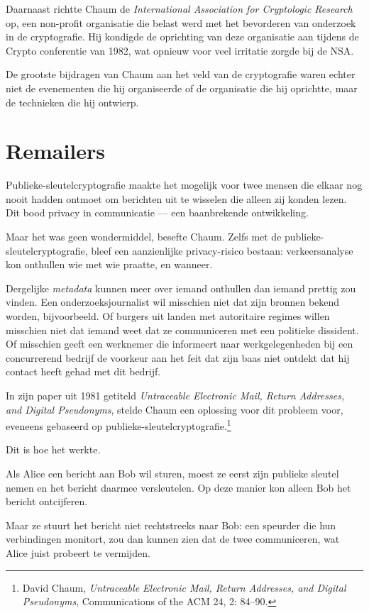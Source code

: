 \documentclass[
  a5paper,
  smalldemyvopaper,11pt,twoside,onecolumn,openright,extrafontsizes,
hidelinks]{memoir}
\begin{document}
Daarnaast richtte Chaum de \emph{International Association for
Cryptologic Research} op, een non-profit organisatie die belast werd met
het bevorderen van onderzoek in de cryptografie. Hij kondigde de
oprichting van deze organisatie aan tijdens de Crypto conferentie van
1982, wat opnieuw voor veel irritatie zorgde bij de NSA.

De grootste bijdragen van Chaum aan het veld van de cryptografie waren
echter niet de evenementen die hij organiseerde of de organisatie die
hij oprichtte, maar de technieken die hij ontwierp.

\section{Remailers}\label{remailers}

Publieke-sleutelcryptografie maakte het mogelijk voor twee mensen die
elkaar nog nooit hadden ontmoet om berichten uit te wisselen die alleen
zij konden lezen. Dit bood privacy in communicatie --- een baanbrekende
ontwikkeling.

Maar het was geen wondermiddel, besefte Chaum. Zelfs met de
publieke-sleutelcryptografie, bleef een aanzienlijke privacy-risico
bestaan: verkeersanalyse kon onthullen wie met wie praatte, en wanneer.

Dergelijke \emph{metadata} kunnen meer over iemand onthullen dan iemand
prettig zou vinden. Een onderzoeksjournalist wil misschien niet dat zijn
bronnen bekend worden, bijvoorbeeld. Of burgers uit landen met
autoritaire regimes willen misschien niet dat iemand weet dat ze
communiceren met een politieke dissident. Of misschien geeft een
werknemer die informeert naar werkgelegenheden bij een concurrerend
bedrijf de voorkeur aan het feit dat zijn baas niet ontdekt dat hij
contact heeft gehad met dit bedrijf.

In zijn paper uit 1981 getiteld \emph{Untraceable Electronic Mail,
Return Addresses, and Digital Pseudonyms}, stelde Chaum een oplossing
voor dit probleem voor, eveneens gebaseerd op
publieke-sleutelcryptografie.\footnote{David Chaum, \emph{Untraceable
  Electronic Mail, Return Addresses, and Digital Pseudonyms},
  Communications of the ACM 24, 2: 84--90.}

Dit is hoe het werkte.

Als Alice een bericht aan Bob wil sturen, moest ze eerst zijn publieke
sleutel nemen en het bericht daarmee versleutelen. Op deze manier kon
alleen Bob het bericht ontcijferen.

Maar ze stuurt het bericht niet rechtstreeks naar Bob: een speurder die
hun verbindingen monitort, zou dan kunnen zien dat de twee communiceren,
wat Alice juist probeert te vermijden.
\end{document}
